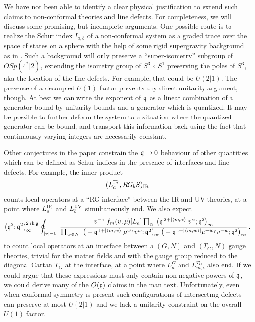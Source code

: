 \documentclass[12pt]{amsart}
\begin{document}
We have not been able to identify a clear physical justification to extend such claims to non-conformal theories and line defects. For completeness, we will discuss some promising, but incomplete arguments. One possible route is to realize the Schur index $I_{a,b}$ of 
a non-conformal system as a graded trace over the space of states on a sphere with the help of some rigid supergravity background as in \cite{Festuccia:2011ws,Closset:2013vra}. Such a background will only preserve a ``super-isometry'' subgroup of $OSp(4^*|2)$, extending the isometry group of $S^3 \times S^1$ preserving the poles of $S^3$, aka the location of the line defects. For example, that could be $U(2|1)$. The presence of a decoupled $U(1)$ factor prevents any direct unitarity argument, though. At best we can write the exponent of $\mathfrak{q}$ as a linear combination of a generator bound by unitarity bounds and a generator which is quantized. It may be possible to further deform the system to a situation where the quantized generator can be bound, and transport this information back using the fact that continuously varying integers are necessarily constant. 

Other conjectures in the paper constrain the $\mathfrak{q} \to 0$ behaviour of other quantities which can be defined as Schur indices in the presence of interfaces and line defects. For example, the inner product 
\begin{equation}
		(L^{\mathrm{IR}}_a,RG_b S)_{\mathrm{IR}}
\end{equation}
counts local operators at a ``RG interface'' \cite{Cordova:2016uwk,Dimofte:2013lba} between the IR and UV theories, at a point where 
$L^{\mathrm{IR}}_a$ and $L^{\mathrm{UV}}_b$ simultaneously end. We also expect 
\begin{equation}\label{eq:int}
	\big(\mathfrak{q}^2;\mathfrak{q}^2\big)_\infty^{2\,\mathrm{rk}\,\mathfrak{g}}
	\oint_{|v|=1}\
	\frac{ v^{-e} \ f_m(v,\mu)[L_a] \prod_{\alpha}\
	   \big(\mathfrak{q}^{\,2+|\langle m,\alpha\rangle|}v^{\alpha};\mathfrak{q}^2\big)_\infty}
	  {\prod_{w\in N}\
	   \big(-\mathfrak{q}^{\,1+|\langle m,w\rangle|}\mu^{w_f} v^{w};\mathfrak{q}^2\big)_\infty\,
	   \big(-\mathfrak{q}^{\,1+|\langle m,w\rangle|}\mu^{-w_f} v^{-w};\mathfrak{q}^2\big)_\infty} \,.
\end{equation}
to count local operators at an interface between a $(G,N)$ and $(T_G,N)$ gauge theories, trivial for the matter fields and with the gauge group reduced to the diagonal Cartan $T_G$ at the interface, at a point where $L^G_a$ and $L^{T_G}_{m,e}$ also end. If we could argue that these expressions must only contain non-negative powers of $\mathfrak{q}$, we could derive many of the $O(\mathfrak{q})$ claims in the man text. Unfortunately, even when conformal symmetry is present such configurations of intersecting defects can preserve at most $U(2|1)$ and we lack a unitarity constraint on the overall $U(1)$ factor. 
\end{document}
